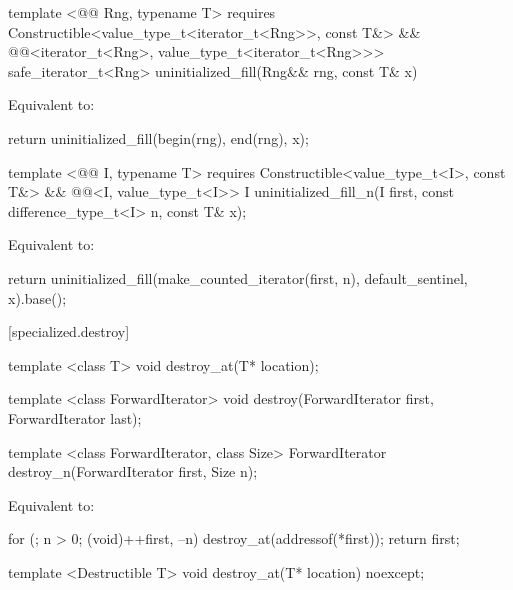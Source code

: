 {\color{addclr}
\begin{codeblock}
template <@@ Rng, typename T>
requires
  Constructible<value_type_t<iterator_t<Rng>>, const T&> &&
  @@<iterator_t<Rng>, value_type_t<iterator_t<Rng>>>
safe_iterator_t<Rng> uninitialized_fill(Rng&& rng, const T& x)
\end{codeblock}

\setcounter{Paras}{0}
\pnum
\effects Equivalent to:
\begin{codeblock}
    return uninitialized_fill(begin(rng), end(rng), x);
\end{codeblock}

\begin{codeblock}
template <@@ I, typename T>
requires
  Constructible<value_type_t<I>, const T&> &&
  @@<I, value_type_t<I>>
I uninitialized_fill_n(I first, const difference_type_t<I> n, const T& x);
\end{codeblock}

\pnum
\effects Equivalent to:
\begin{codeblock}
    return uninitialized_fill(make_counted_iterator(first, n), default_sentinel{}, x).base();
\end{codeblock}
} %

[specialized.destroy]{}
{\color{remclr}
\begin{codeblock}
template <class T>
  void destroy_at(T* location);
\end{codeblock}

\begin{codeblock}
template <class ForwardIterator>
  void destroy(ForwardIterator first, ForwardIterator last);
\end{codeblock}

\begin{codeblock}
template <class ForwardIterator, class Size>
  ForwardIterator destroy_n(ForwardIterator first, Size n);
\end{codeblock}

\setcounter{Paras}{2}
\pnum
\effects Equivalent to:
\begin{codeblock}
      for (; n > 0; (void)++first, --n)
          destroy_at(addressof(*first));
        return first;
\end{codeblock}
} %

{\color{addclr}
\begin{codeblock}
template <Destructible T>
void destroy_at(T* location) noexcept;
\end{codeblock}
} %

